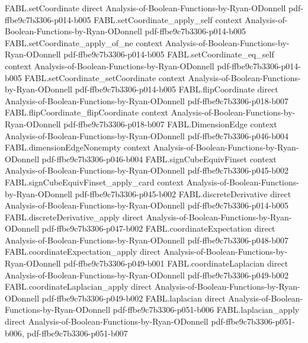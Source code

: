 \begin{theorem}
  {FABL.setCoordinate}
  {direct}
  {Analysis-of-Boolean-Functions-by-Ryan-ODonnell}
  {pdf-ffbe9c7b3306-p014-b005}
\proofstep
  {FABL.setCoordinate_apply_self}
  {context}
  {Analysis-of-Boolean-Functions-by-Ryan-ODonnell}
  {pdf-ffbe9c7b3306-p014-b005}
\proofstep
  {FABL.setCoordinate_apply_of_ne}
  {context}
  {Analysis-of-Boolean-Functions-by-Ryan-ODonnell}
  {pdf-ffbe9c7b3306-p014-b005}
\proofstep
  {FABL.setCoordinate_eq_self}
  {context}
  {Analysis-of-Boolean-Functions-by-Ryan-ODonnell}
  {pdf-ffbe9c7b3306-p014-b005}
\proofstep
  {FABL.setCoordinate_setCoordinate}
  {context}
  {Analysis-of-Boolean-Functions-by-Ryan-ODonnell}
  {pdf-ffbe9c7b3306-p014-b005}
\proofstep
  {FABL.flipCoordinate}
  {direct}
  {Analysis-of-Boolean-Functions-by-Ryan-ODonnell}
  {pdf-ffbe9c7b3306-p018-b007}
\proofstep
  {FABL.flipCoordinate_flipCoordinate}
  {context}
  {Analysis-of-Boolean-Functions-by-Ryan-ODonnell}
  {pdf-ffbe9c7b3306-p018-b007}
\proofstep
  {FABL.DimensionEdge}
  {context}
  {Analysis-of-Boolean-Functions-by-Ryan-ODonnell}
  {pdf-ffbe9c7b3306-p046-b004}
\proofstep
  {FABL.dimensionEdgeNonempty}
  {context}
  {Analysis-of-Boolean-Functions-by-Ryan-ODonnell}
  {pdf-ffbe9c7b3306-p046-b004}
\proofstep
  {FABL.signCubeEquivFinset}
  {context}
  {Analysis-of-Boolean-Functions-by-Ryan-ODonnell}
  {pdf-ffbe9c7b3306-p045-b002}
\proofstep
  {FABL.signCubeEquivFinset_apply_card}
  {context}
  {Analysis-of-Boolean-Functions-by-Ryan-ODonnell}
  {pdf-ffbe9c7b3306-p045-b002}
\proofstep
  {FABL.discreteDerivative}
  {direct}
  {Analysis-of-Boolean-Functions-by-Ryan-ODonnell}
  {pdf-ffbe9c7b3306-p014-b005}
\proofstep
  {FABL.discreteDerivative_apply}
  {direct}
  {Analysis-of-Boolean-Functions-by-Ryan-ODonnell}
  {pdf-ffbe9c7b3306-p047-b002}
\proofstep
  {FABL.coordinateExpectation}
  {direct}
  {Analysis-of-Boolean-Functions-by-Ryan-ODonnell}
  {pdf-ffbe9c7b3306-p048-b007}
\proofstep
  {FABL.coordinateExpectation_apply}
  {direct}
  {Analysis-of-Boolean-Functions-by-Ryan-ODonnell}
  {pdf-ffbe9c7b3306-p049-b001}
\proofstep
  {FABL.coordinateLaplacian}
  {direct}
  {Analysis-of-Boolean-Functions-by-Ryan-ODonnell}
  {pdf-ffbe9c7b3306-p049-b002}
\proofstep
  {FABL.coordinateLaplacian_apply}
  {direct}
  {Analysis-of-Boolean-Functions-by-Ryan-ODonnell}
  {pdf-ffbe9c7b3306-p049-b002}
\proofstep
  {FABL.laplacian}
  {direct}
  {Analysis-of-Boolean-Functions-by-Ryan-ODonnell}
  {pdf-ffbe9c7b3306-p051-b006}
\proofstep
  {FABL.laplacian_apply}
  {direct}
  {Analysis-of-Boolean-Functions-by-Ryan-ODonnell}
  {pdf-ffbe9c7b3306-p051-b006,
    pdf-ffbe9c7b3306-p051-b007}
\proofstep

\end{theorem}
